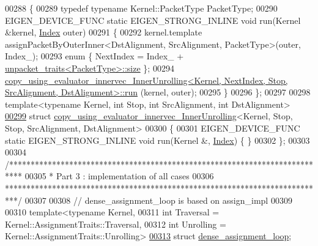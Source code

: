 \begin{DoxyCode}
00288 \{
00289   \textcolor{keyword}{typedef} \textcolor{keyword}{typename} Kernel::PacketType PacketType;
00290   EIGEN\_DEVICE\_FUNC \textcolor{keyword}{static} EIGEN\_STRONG\_INLINE \textcolor{keywordtype}{void} run(Kernel &kernel, \hyperlink{namespace_eigen_a62e77e0933482dafde8fe197d9a2cfde}{Index} outer)
00291   \{
00292     kernel.template assignPacketByOuterInner<DstAlignment, SrcAlignment, PacketType>(outer, Index\_);
00293     \textcolor{keyword}{enum} \{ NextIndex = Index\_ + \hyperlink{struct_eigen_1_1internal_1_1unpacket__traits}{unpacket\_traits<PacketType>::size} \};
00294     
      \hyperlink{struct_eigen_1_1internal_1_1copy__using__evaluator__innervec___inner_unrolling}{copy\_using\_evaluator\_innervec\_InnerUnrolling<Kernel, NextIndex, Stop, SrcAlignment, DstAlignment>::run}
      (kernel, outer);
00295   \}
00296 \};
00297 
00298 \textcolor{keyword}{template}<\textcolor{keyword}{typename} Kernel, \textcolor{keywordtype}{int} Stop, \textcolor{keywordtype}{int} SrcAlignment, \textcolor{keywordtype}{int} DstAlignment>
\hyperlink{struct_eigen_1_1internal_1_1copy__using__evaluator__innervec___inner_unrolling_3_01_kernel_00_01f9638de23111656da8d7300be7918511}{00299} \textcolor{keyword}{struct }\hyperlink{struct_eigen_1_1internal_1_1copy__using__evaluator__innervec___inner_unrolling}{copy\_using\_evaluator\_innervec\_InnerUnrolling}<Kernel, 
      Stop, Stop, SrcAlignment, DstAlignment>
00300 \{
00301   EIGEN\_DEVICE\_FUNC \textcolor{keyword}{static} EIGEN\_STRONG\_INLINE \textcolor{keywordtype}{void} run(Kernel &, \hyperlink{namespace_eigen_a62e77e0933482dafde8fe197d9a2cfde}{Index}) \{ \}
00302 \};
00303 
00304 \textcolor{comment}{/***************************************************************************}
00305 \textcolor{comment}{* Part 3 : implementation of all cases}
00306 \textcolor{comment}{***************************************************************************/}
00307 
00308 \textcolor{comment}{// dense\_assignment\_loop is based on assign\_impl}
00309 
00310 \textcolor{keyword}{template}<\textcolor{keyword}{typename} Kernel,
00311          \textcolor{keywordtype}{int} Traversal = Kernel::AssignmentTraits::Traversal,
00312          \textcolor{keywordtype}{int} Unrolling = Kernel::AssignmentTraits::Unrolling>
\hyperlink{struct_eigen_1_1internal_1_1dense__assignment__loop}{00313} \textcolor{keyword}{struct }\hyperlink{struct_eigen_1_1internal_1_1dense__assignment__loop}{dense\_assignment\_loop};

\end{DoxyCode}
